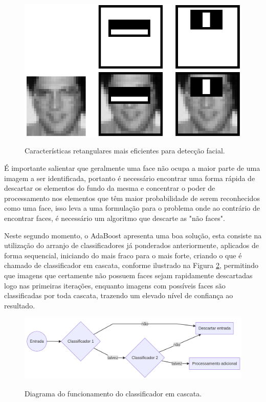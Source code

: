 \begin{figure}[htb]
    \centering
    \caption{Características retangulares mais eficientes para detecção facial.}
    \includegraphics[scale=.4]{figs/top-features.png}
    \label{fig:top-features}
\end{figure}

É importante salientar que geralmente uma face não ocupa a maior parte de uma imagem a ser identificada, portanto é necessário encontrar uma forma rápida de descartar os elementos do fundo da mesma e concentrar o poder de processamento nos elementos que têm maior probabilidade de serem reconhecidos como uma face, isso leva a uma formulação para o problema onde ao contrário de encontrar faces, é necessário um algoritmo que descarte as "não faces".

Neste segundo momento, o AdaBoost apresenta uma boa solução, esta consiste na utilização do arranjo de classificadores já ponderados anteriormente, aplicados de forma sequencial, iniciando do mais fraco para o mais forte, criando o que é chamado de classificador em cascata, conforme ilustrado na Figura \ref{fig:cascade-classifier}, permitindo que imagens que certamente não possuem faces sejam rapidamente descartadas logo nas primeiras iterações, enquanto imagens com possíveis faces são classificadas por toda cascata, trazendo um elevado nível de confiança ao resultado.

\begin{figure}[htb]
    \centering
    \caption{Diagrama do funcionamento do classificador em cascata.}
    \includegraphics[scale=.2]{figs/cascade-classifier.png}
    \label{fig:cascade-classifier}
\end{figure}

